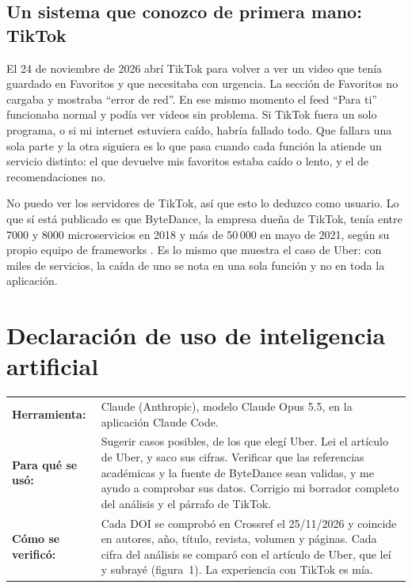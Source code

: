 \documentclass[11pt,a4paper]{article}
\begin{document}
\subsection*{Un sistema que conozco de primera mano: TikTok}

El 24 de noviembre de 2026 abrí TikTok para volver a ver un video que tenía guardado en Favoritos y que necesitaba con urgencia. La sección de Favoritos no cargaba y mostraba \enquote{error de red}. En ese mismo momento el feed \enquote{Para ti} funcionaba normal y podía ver videos sin problema. Si TikTok fuera un solo programa, o si mi internet estuviera caído, habría fallado todo. Que fallara una sola parte y la otra siguiera es lo que pasa cuando cada función la atiende un servicio distinto: el que devuelve mis favoritos estaba caído o lento, y el de recomendaciones no.

No puedo ver los servidores de TikTok, así que esto lo deduzco como usuario. Lo que sí está publicado es que ByteDance, la empresa dueña de TikTok, tenía entre 7000 y 8000 microservicios en 2018 y más de 50\,000 en mayo de 2021, según su propio equipo de frameworks \cite{cloudwego}. Es lo mismo que muestra el caso de Uber: con miles de servicios, la caída de uno se nota en una sola función y no en toda la aplicación.

\section*{Declaración de uso de inteligencia artificial}

\noindent
\begin{tabularx}{\textwidth}{@{}>{\bfseries}l >{\raggedright\arraybackslash}X@{}}
  Herramienta: & Claude (Anthropic), modelo Claude Opus 5.5, en la aplicación Claude Code. \\
  Para qué se usó: & Sugerir casos posibles, de los que elegí Uber. Lei el artículo de Uber, y saco sus cifras. Verificar que las referencias académicas y la fuente de ByteDance sean validas, y me ayudo a comprobar sus datos. Corrigio mi borrador completo del análisis y el párrafo de TikTok. \\[4pt]
  Cómo se verificó: & Cada DOI se comprobó en Crossref el 25/11/2026 y coincide en autores, año, título, revista, volumen y páginas. Cada cifra del análisis se comparó con el artículo de Uber, que leí y subrayé (figura~1). La experiencia con TikTok es mía.
\end{tabularx}

\printbibliography[title={Referencias}]
\end{document}
